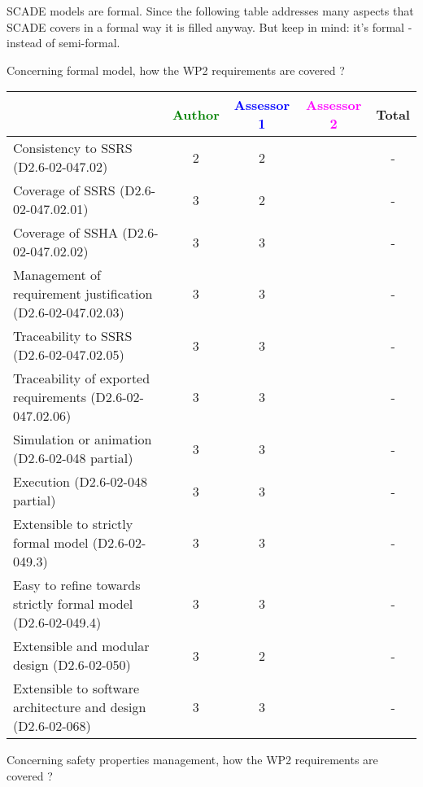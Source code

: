 \begin{author_comment}
SCADE models are formal. Since the following table addresses many aspects that SCADE covers in a formal way it is filled anyway. But keep in mind: it's formal - instead of semi-formal.  
\end{author_comment}


Concerning formal model, how the WP2 requirements are covered ?

\begin{tabular}{|l | c | c | c | c|}
\hline
& \textcolor{green}{Author} & \textcolor{blue}{Assessor 1} & \textcolor{magenta}{Assessor 2} & Total \\
\hline 
Consistency to SSRS (D2.6-02-047.02) & 2     & 2     & & - \\
\hline
Coverage of SSRS (D2.6-02-047.02.01)  & 3     & 2     & & - \\
\hline
Coverage of SSHA (D2.6-02-047.02.02)  &  3& 3     & & - \\
\hline
Management of requirement justification (D2.6-02-047.02.03)  &
3& 3     & & - \\
\hline
Traceability to  SSRS (D2.6-02-047.02.05)  &  3& 3     & & - \\
\hline
Traceability of exported requirements (D2.6-02-047.02.06)  &
3& 3     & & - \\
\hline
Simulation or animation (D2.6-02-048 partial)  &  3&
3& & - \\
\hline
Execution (D2.6-02-048 partial)  & 3     & 3     & & - \\
\hline
Extensible to strictly formal model (D2.6-02-049.3) &
3  & 3     & & - \\
\hline
Easy to  refine towards strictly formal model (D2.6-02-049.4) &
3 & 3     & & - \\
\hline
Extensible and modular design (D2.6-02-050)  & 3     & 2     & & - \\
\hline
Extensible to software architecture and design (D2.6-02-068)   &
3& 3     & & - \\
\hline
\end{tabular}

Concerning safety properties management, how the WP2 requirements are covered ?

